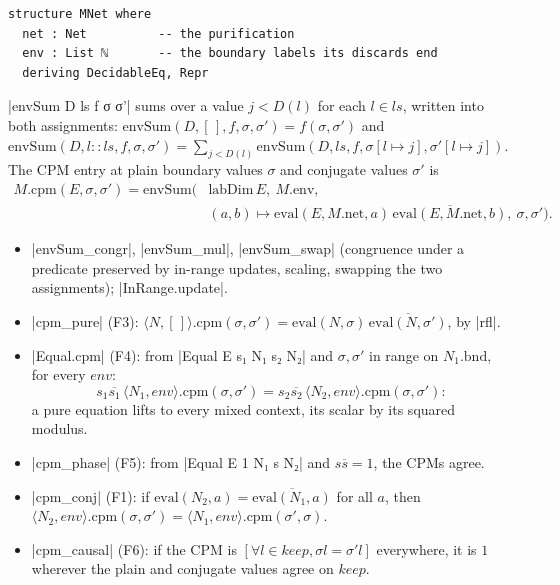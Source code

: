 \begin{definition}
\begin{lstlisting}[style=leancore]
structure MNet where
  net : Net          -- the purification
  env : List ℕ       -- the boundary labels its discards end
  deriving DecidableEq, Repr
\end{lstlisting}
\lean|envSum D ls f σ σ'| sums over a value $j<D(l)$ for each $l\in ls$, written into both
assignments:
$\mathrm{envSum}(D,[\,],f,\sigma,\sigma')=f(\sigma,\sigma')$ and
$\mathrm{envSum}(D,l{::}ls,f,\sigma,\sigma')=\sum_{j<D(l)}\mathrm{envSum}(D,ls,f,\sigma[l\mapsto
j],\sigma'[l\mapsto j])$. The CPM entry at plain boundary values $\sigma$ and conjugate values
$\sigma'$ is
\[\begin{aligned}
 M.\mathrm{cpm}(E,\sigma,\sigma')=\mathrm{envSum}\bigl(&\mathrm{labDim}\,E,\ M.\mathrm{env},\\
 &(a,b)\mapsto\mathrm{eval}(E,M.\mathrm{net},a)\,\overline{\mathrm{eval}(E,M.\mathrm{net},b)},\ \sigma,\sigma'\bigr).
\end{aligned}\]
\end{definition}

\begin{theorem}
\begin{itemize}
\item \lean|envSum_congr|, \lean|envSum_mul|, \lean|envSum_swap| (congruence under a predicate
  preserved by in-range updates, scaling, swapping the two assignments); \lean|InRange.update|.
\item \lean|cpm_pure| (F3): $\langle N,[\,]\rangle.\mathrm{cpm}(\sigma,\sigma')=\mathrm{eval}(N,\sigma)\,
  \overline{\mathrm{eval}(N,\sigma')}$, by \lean|rfl|.
\item \lean|Equal.cpm| (F4): from \lean|Equal E s₁ N₁ s₂ N₂| and $\sigma,\sigma'$ in range on
  $N_1.\mathrm{bnd}$, for every $env$:
  \[s_1\overline{s_1}\,\langle N_1,env\rangle.\mathrm{cpm}(\sigma,\sigma')=
  s_2\overline{s_2}\,\langle N_2,env\rangle.\mathrm{cpm}(\sigma,\sigma'):\]
  a pure equation lifts to every mixed context, its scalar by its squared modulus.
\item \lean|cpm_phase| (F5): from \lean|Equal E 1 N₁ s N₂| and $s\overline s=1$, the CPMs agree.
\item \lean|cpm_conj| (F1): if $\mathrm{eval}(N_2,a)=\overline{\mathrm{eval}(N_1,a)}$ for all $a$, then
  $\langle N_2,env\rangle.\mathrm{cpm}(\sigma,\sigma')=\langle N_1,env\rangle.\mathrm{cpm}(\sigma',\sigma)$.
\item \lean|cpm_causal| (F6): if the CPM is $[\forall l\in keep,\sigma l=\sigma' l]$ everywhere, it is
  $1$ wherever the plain and conjugate values agree on $keep$.
\end{itemize}
\end{theorem}

